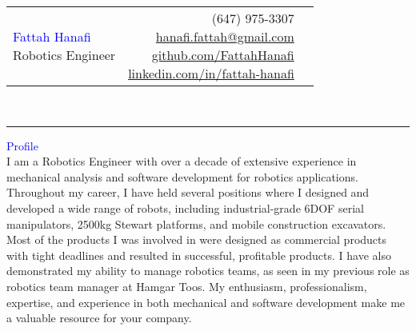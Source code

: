 \documentclass{letter}
\newcommand{\firstlastname}[1]{\noindent\textcolor{Blue}{\Huge{#1}}}
\newcommand{\subtitle}[1]{\noindent\textcolor{NavyBlue}{\Large{#1}}}
\newcommand{\header}[1]{\noindent\textcolor{Blue}{\Large{#1}}\\}
\begin{document}
\begin{tabularx}{0.9\textwidth}{X r l}
	\makecell[l]{\firstlastname{Fattah Hanafi} \\\subtitle{Robotics Engineer}} & \makecell[r]{(647) 975-3307\\\href{mailto:hanafi.fattah@gmail.com}{hanafi.fattah@gmail.com}\\\href{https://github.com/FattahHanafi}{github.com/FattahHanafi}\\\href{https://www.linkedin.com/in/fattah-hanafi/}{linkedin.com/in/fattah-hanafi}} & \makecell[c]{\faPhone\\\faEnvelopeO\\\faGithub\\\faLinkedin}
\end{tabularx}\\
\noindent\rule{\textwidth}{0.4pt}

\header{Profile}
\indent\small{I am a Robotics Engineer with over a decade of extensive experience in mechanical analysis and software development for robotics applications. Throughout my career, I have held several positions where I designed and developed a wide range of robots, including industrial-grade 6DOF serial manipulators, 2500kg Stewart platforms, and mobile construction excavators. Most of the products I was involved in were designed as commercial products with tight deadlines and resulted in successful, profitable products. I have also demonstrated my ability to manage robotics teams, as seen in my previous role as robotics team manager at Hamgar Toos. My enthusiasm, professionalism, expertise, and experience in both mechanical and software development make me a valuable resource for your company.}
\end{document}
